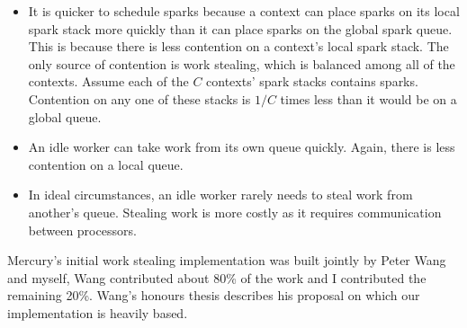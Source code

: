 \begin{itemize}

    \item
    It is quicker to schedule sparks because
    a context can place sparks on its local spark stack more quickly
    than it can place sparks on the global spark queue.
    This is because there is less contention on a context's
    local spark stack.
    The only source of contention is work stealing,
    which is balanced among all of the contexts.
    Assume each of the $C$ contexts' spark stacks contains sparks.
    Contention on any one of these stacks is $1/C$ times less than it would be
    on a global queue.

    \item
    An idle worker can take work from its own queue quickly.
    Again, there is less contention on a local queue.

    \item
    In ideal circumstances,
    an idle worker rarely needs to steal work from another's queue.
    Stealing work is more costly as it requires communication between
    processors.

\end{itemize}

Mercury's initial work stealing implementation was built jointly by
Peter Wang and myself,
Wang contributed about 80\% of the work
and I contributed the remaining 20\%.
Wang's honours thesis \citep{wang:2006:hons} describes his proposal on which
our implementation is heavily based.

